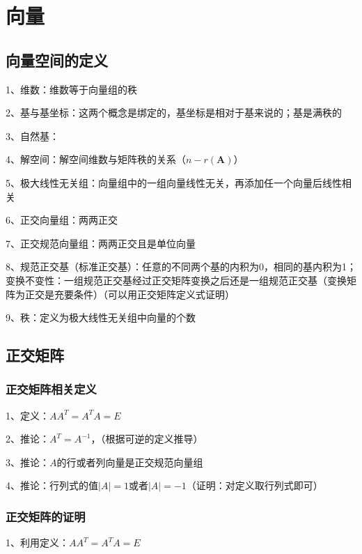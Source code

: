 \chapter{向量}

\section{向量空间的定义}

1、维数：维数等于向量组的秩

2、基与基坐标：这两个概念是绑定的，基坐标是相对于基来说的；基是满秩的

3、自然基：

4、解空间：解空间维数与矩阵秩的关系（$n-r(\boldsymbol{A})$）

5、极大线性无关组：向量组中的一组向量线性无关，再添加任一个向量后线性相关

6、正交向量组：两两正交

7、正交规范向量组：两两正交且是单位向量

8、规范正交基（标准正交基）：任意的不同两个基的内积为0，相同的基内积为1；变换不变性：一组规范正交基经过正交矩阵变换之后还是一组规范正交基（变换矩阵为正交是充要条件）（可以用正交矩阵定义式证明）

9、秩：定义为极大线性无关组中向量的个数

\section{正交矩阵}



\subsection{正交矩阵相关定义}

1、定义：$AA^T=A^TA=E$

2、推论：$A^T=A^{-1}$，（根据可逆的定义推导）

3、推论：$A$的行或者列向量是正交规范向量组

4、推论：行列式的值$|A|=1$或者$|A|=-1$（证明：对定义取行列式即可）



\subsection{正交矩阵的证明}

1、利用定义：$AA^T=A^TA=E$

